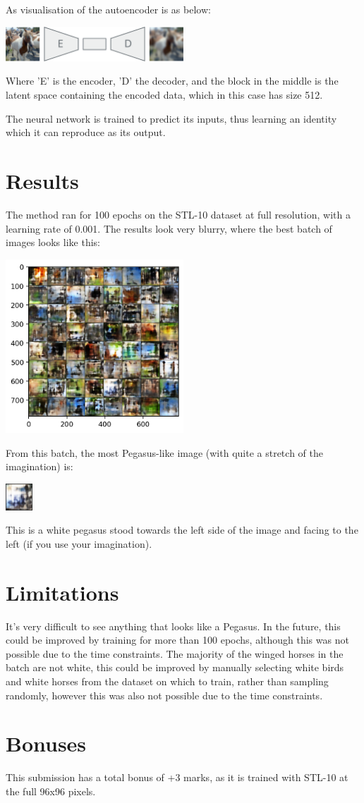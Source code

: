 \documentclass{article}
\begin{document}
As visualisation of the autoencoder is as below: 
\begin{center}
    \includegraphics[width=0.5\textwidth]{figures/architecture.pdf}
\end{center}
Where 'E' is the encoder, 'D' the decoder, and the block in the middle is the latent space 
containing the encoded data, which in this case has size 512. 

The neural network is trained to predict its inputs, thus learning an identity which it can reproduce as its output. 

\section{Results}
The method ran for 100 epochs on the STL-10 dataset at full resolution, with a learning rate of 0.001. 
The results look very blurry, where the best batch of images looks like this:
\begin{center}
    \includegraphics[width=0.5\textwidth]{figures/best-batch.png}
\end{center}
From this batch, the most Pegasus-like image (with quite a stretch of the imagination) is:
\begin{center}
    \includegraphics[width=0.075\textwidth]{figures/best-pegasus.png}
\end{center}
This is a white pegasus stood towards the left side of the image and facing to the left (if you use your imagination). 

\section{Limitations}
It's very difficult to see anything that looks like a Pegasus. 
In the future, this could be improved by training for more than 100 epochs, 
although this was not possible due to the time constraints. 
The majority of the winged horses in the batch are not white, this could be improved by manually selecting white birds 
and white horses from the dataset on which to train, rather than sampling randomly, 
however this was also not possible due to the time constraints. 

\section*{Bonuses}
This submission has a total bonus of +3 marks, as it is trained with STL-10 at the full 96x96 pixels.

\printbibliography
\end{document}
